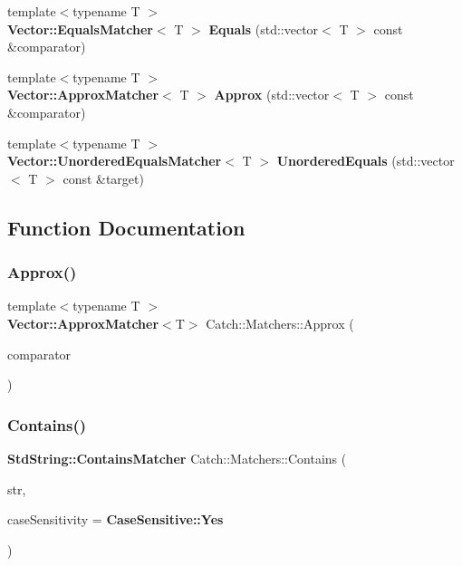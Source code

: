 \begin{DoxyCompactItemize}
\item 
{\footnotesize template$<$typename T $>$ }\\\textbf{ Vector\+::\+Equals\+Matcher}$<$ T $>$ \textbf{ Equals} (std\+::vector$<$ T $>$ const \&comparator)
\item 
{\footnotesize template$<$typename T $>$ }\\\textbf{ Vector\+::\+Approx\+Matcher}$<$ T $>$ \textbf{ Approx} (std\+::vector$<$ T $>$ const \&comparator)
\item 
{\footnotesize template$<$typename T $>$ }\\\textbf{ Vector\+::\+Unordered\+Equals\+Matcher}$<$ T $>$ \textbf{ Unordered\+Equals} (std\+::vector$<$ T $>$ const \&target)
\end{DoxyCompactItemize}


\subsection{Function Documentation}
\mbox{\label{namespace_catch_1_1_matchers_af5b9fe04e095ee688e4058ab27b92e04}} 
\subsubsection{Approx()}
{\footnotesize\ttfamily template$<$typename T $>$ \\
\textbf{ Vector\+::\+Approx\+Matcher}$<$T$>$ Catch\+::\+Matchers\+::\+Approx (\begin{DoxyParamCaption}\item[{std\+::vector$<$ T $>$ const \&}]{comparator }\end{DoxyParamCaption})}

\mbox{\label{namespace_catch_1_1_matchers_a1f6c2accdc6cd75a84d7112dcad647b4}} 
\subsubsection{Contains()\hspace{0.1cm}{\footnotesize\ttfamily [1/2]}}
{\footnotesize\ttfamily \textbf{ Std\+String\+::\+Contains\+Matcher} Catch\+::\+Matchers\+::\+Contains (\begin{DoxyParamCaption}\item[{std\+::string const \&}]{str,  }\item[{\textbf{ Case\+Sensitive\+::\+Choice}}]{case\+Sensitivity = {\ttfamily \textbf{ Case\+Sensitive\+::\+Yes}} }\end{DoxyParamCaption})}

